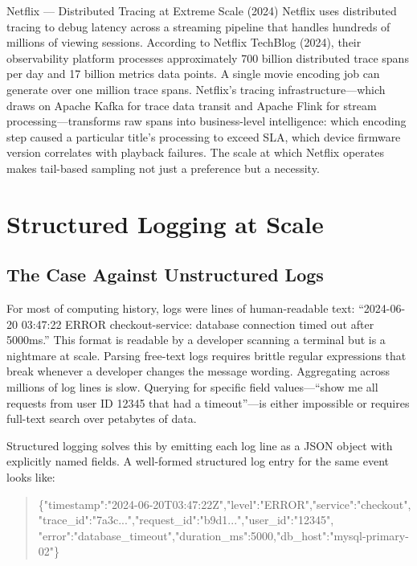 \documentclass[11pt,a4paper]{article}
\begin{document}
\begin{industrybox}{Netflix --- Distributed Tracing at Extreme Scale (2024)}
  Netflix uses distributed tracing to debug latency across a streaming pipeline that handles hundreds of millions of viewing sessions. According to Netflix TechBlog (2024), their observability platform processes approximately 700 billion distributed trace spans per day and 17 billion metrics data points. A single movie encoding job can generate over one million trace spans. Netflix's tracing infrastructure---which draws on Apache Kafka for trace data transit and Apache Flink for stream processing---transforms raw spans into business-level intelligence: which encoding step caused a particular title's processing to exceed SLA, which device firmware version correlates with playback failures. The scale at which Netflix operates makes tail-based sampling not just a preference but a necessity.
\end{industrybox}

\section{Structured Logging at Scale}

\subsection{The Case Against Unstructured Logs}

For most of computing history, logs were lines of human-readable text: ``2024-06-20 03:47:22 ERROR checkout-service: database connection timed out after 5000ms.'' This format is readable by a developer scanning a terminal but is a nightmare at scale. Parsing free-text logs requires brittle regular expressions that break whenever a developer changes the message wording. Aggregating across millions of log lines is slow. Querying for specific field values---``show me all requests from user ID 12345 that had a timeout''---is either impossible or requires full-text search over petabytes of data.

Structured logging solves this by emitting each log line as a JSON object with explicitly named fields. A well-formed structured log entry for the same event looks like:

\begin{quote}
\small\ttfamily\sloppy
\{"timestamp":"2024-06-20T03:47:22Z","level":"ERROR","service":"checkout",\\
"trace\_id":"7a3c...","request\_id":"b9d1...","user\_id":"12345",\\
"error":"database\_timeout","duration\_ms":5000,"db\_host":"mysql-primary-02"\}
\end{quote}
\end{document}
